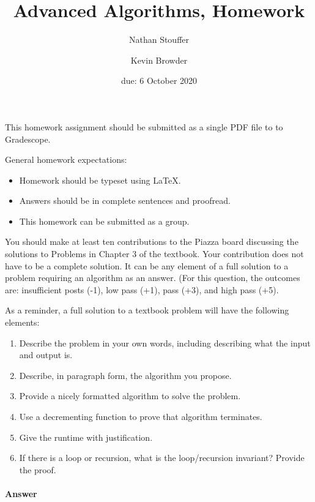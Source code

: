 \documentclass{article}
\title{Advanced Algorithms, Homework \hwnum}
\author{Nathan Stouffer \and Kevin Browder}
\date{due: 6 October 2020}
\begin{document}
\maketitle

This homework assignment should be
submitted as a single PDF file to to Gradescope.

General homework expectations:
\begin{itemize}
    \item Homework should be typeset using \LaTeX.
    \item Answers should be in complete sentences and proofread.
    \item This homework can be submitted as a group.
\end{itemize}

\nextprob
{}

You should make at least ten contributions to the Piazza board
discussing the solutions to Problems in Chapter 3 of the textbook.  Your
contribution does not have to be a complete solution.  It can be any element of
a full solution to a problem requiring an algorithm as an answer.  (For this
question, the outcomes are: insufficient posts (-1), low pass (+1), pass (+3),
and high pass (+5).

As a reminder, a full solution to a textbook problem will have the following elements:
\begin{enumerate}
    \item Describe the problem in your own words, including
        describing what the input and output is.
    \item Describe, in paragraph form, the algorithm you propose.
    \item Provide a nicely formatted algorithm to solve the problem.
    \item Use a decrementing function to prove that algorithm terminates.
    \item Give the runtime with justification.
    \item If there is a loop or recursion, what is the loop/recursion invariant? Provide the proof.
\end{enumerate}

\paragraph{Answer}

\end{document}
